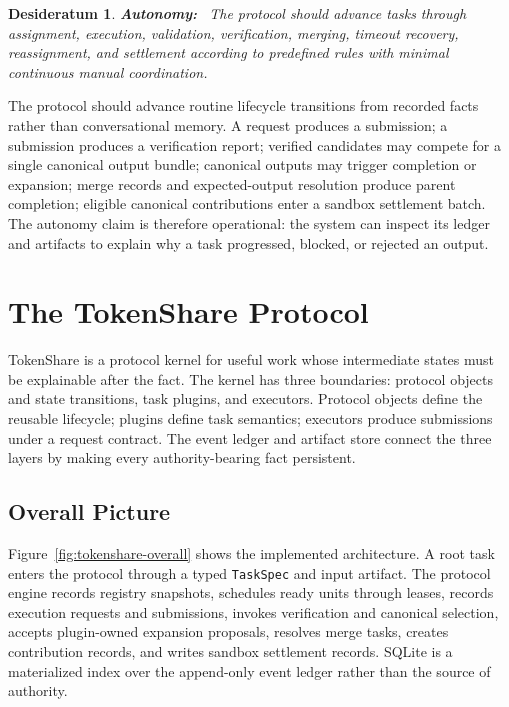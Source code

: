 \documentclass{article}
\theoremstyle{plain}
\newtheorem{desideratum}{Desideratum}
\begin{document}
\begin{desideratum}
\textbf{Autonomy:}~ The protocol should advance tasks through assignment, execution, validation, verification, merging, timeout recovery, reassignment, and settlement according to predefined rules with minimal continuous manual coordination.
\end{desideratum}

{\color{blue}
The protocol should advance routine lifecycle transitions from recorded facts rather than conversational memory. A request produces a submission; a submission produces a verification report; verified candidates may compete for a single canonical output bundle; canonical outputs may trigger completion or expansion; merge records and expected-output resolution produce parent completion; eligible canonical contributions enter a sandbox settlement batch. The autonomy claim is therefore operational: the system can inspect its ledger and artifacts to explain why a task progressed, blocked, or rejected an output.
}



\section{The TokenShare Protocol}

{\color{blue}
TokenShare is a protocol kernel for useful work whose intermediate states must be explainable after the fact. The kernel has three boundaries: protocol objects and state transitions, task plugins, and executors. Protocol objects define the reusable lifecycle; plugins define task semantics; executors produce submissions under a request contract. The event ledger and artifact store connect the three layers by making every authority-bearing fact persistent.
}

\subsection{Overall Picture}

{\color{blue}
Figure~\ref{fig:tokenshare-overall} shows the implemented architecture. A root task enters the protocol through a typed \texttt{TaskSpec} and input artifact. The protocol engine records registry snapshots, schedules ready units through leases, records execution requests and submissions, invokes verification and canonical selection, accepts plugin-owned expansion proposals, resolves merge tasks, creates contribution records, and writes sandbox settlement records. SQLite is a materialized index over the append-only event ledger rather than the source of authority.
}
\end{document}
